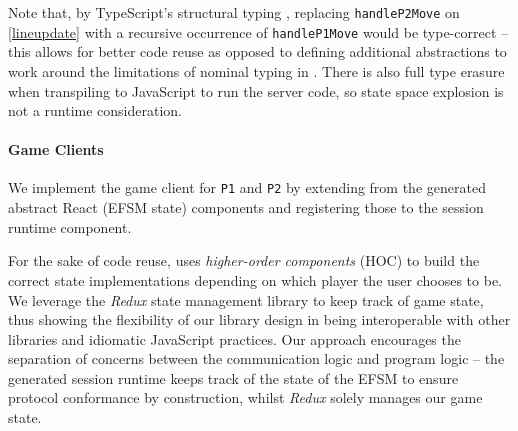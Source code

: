 Note that, by TypeScript's structural typing 
\cite{TypeScriptSpec}, replacing
\texttt{handleP2Move} on \cref{lineupdate} with a recursive 
occurrence of \texttt{handleP1Move} would be
type-correct -- this allows for better code reuse as opposed to 
defining
additional abstractions to work around the limitations of nominal 
typing in
\cite{Hybrid2016}.
There is also full type erasure when transpiling to JavaScript to 
run the server code, so state space explosion is not a 
runtime consideration.

\paragraph{Game Clients}
We implement the game client for \texttt{P1} and
\texttt{P2} by extending from the generated abstract React (EFSM state)
components and registering those to the session runtime component.

For the sake of code reuse, \cite{NoughtsAndCrosses}
uses \textit{higher-order components} (HOC) to build the correct state
implementations depending on which player the user chooses to be.
We leverage the \textit{Redux} \cite{Redux} state management library to keep track of game
state, thus showing the flexibility of our library design in being
interoperable with other libraries and idiomatic JavaScript practices.
Our approach encourages the separation of concerns between the 
communication logic and program logic -- the generated session runtime
keeps track of the state of the EFSM to ensure protocol conformance by 
construction, whilst \textit{Redux} solely manages our game state.